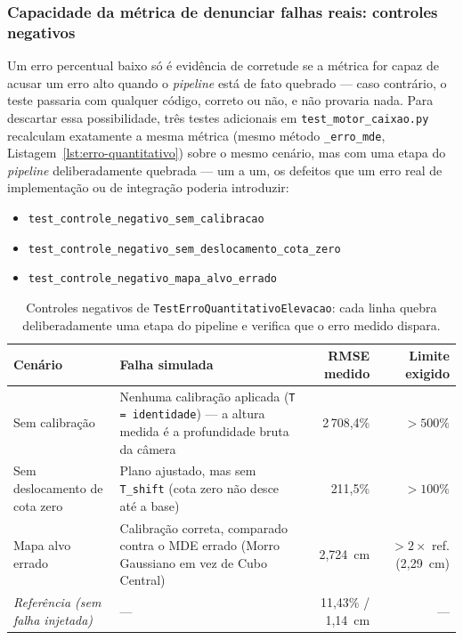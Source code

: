 \subsubsection{Capacidade da métrica de denunciar falhas reais: controles negativos}
\label{subsec:controles-negativos}

Um erro percentual baixo só é evidência de corretude se a métrica for
capaz de acusar um erro alto quando o \textit{pipeline} está de fato
quebrado — caso contrário, o teste passaria com qualquer código,
correto ou não, e não provaria nada. Para descartar essa
possibilidade, três testes adicionais em \texttt{test\_motor\_caixao.py}
recalculam exatamente a mesma métrica (mesmo método
\texttt{\_erro\_mde}, Listagem~\ref{lst:erro-quantitativo}) sobre o
mesmo cenário, mas com uma etapa do \textit{pipeline} deliberadamente
quebrada — um a um, os defeitos que um erro real de implementação ou
de integração poderia introduzir:

\begin{itemize}
    \item \texttt{test\_controle\_negativo\_sem\_calibracao}
    \item \texttt{test\_controle\_negativo\_sem\_deslocamento\_cota\_zero}
    \item \texttt{test\_controle\_negativo\_mapa\_alvo\_errado}
\end{itemize}

\begin{table}[!ht]
\centering
\caption{Controles negativos de \texttt{TestErroQuantitativoElevacao}: cada linha quebra deliberadamente uma etapa do pipeline e verifica que o erro medido dispara.}
\label{tab:controles-negativos}
\small
\begin{tabularx}{\textwidth}{@{}l X r r@{}}
\toprule
\textbf{Cenário} & \textbf{Falha simulada} & \textbf{RMSE medido} & \textbf{Limite exigido} \\
\midrule
Sem calibração & Nenhuma calibração aplicada (\texttt{T = identidade}) — a altura medida é a profundidade bruta da câmera & 2\,708,4\% & $> 500\%$ \\
Sem deslocamento de cota zero & Plano ajustado, mas sem \texttt{T\_shift} (cota zero não desce até a base) & 211,5\% & $> 100\%$ \\
Mapa alvo errado & Calibração correta, comparado contra o MDE errado (Morro Gaussiano em vez de Cubo Central) & 2,724~cm & $> 2\times$ ref. (2,29~cm) \\
\midrule
\emph{Referência (sem falha injetada)} & — & 11,43\% / 1,14~cm & — \\
\bottomrule
\end{tabularx}
\end{table}

